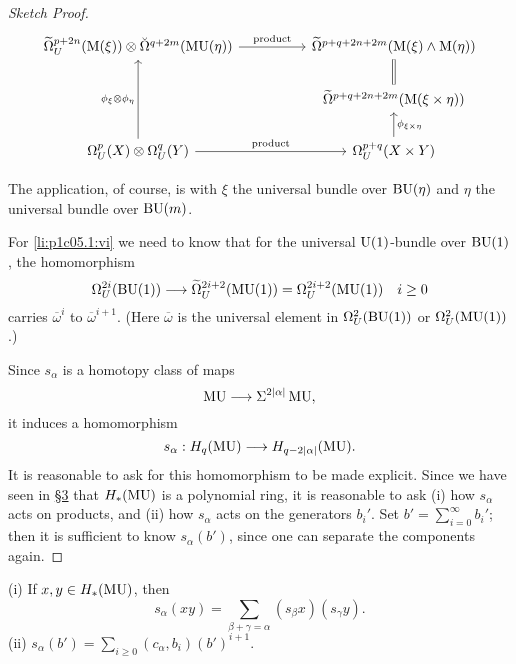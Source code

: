 \documentclass[../main]{subfiles}
\begin{document}
\begin{proof}[Sketch Proof]
\begin{equation*}
\begin{tikzcd}
{\tilde \Omega}_U^{p + 2n}(\te{M}(\xi)) \otimes {\breve \Omega}^{q + 2m}(\te{MU}(\eta)) \arrow[rr, "\mathrm{product}"] &  & {\tilde \Omega}^{p + q + 2n + 2m}(\te{M}(\xi) \wedge \te{M}(\eta))                             \\
                                                                                                                      &  & {\tilde \Omega}^{p + q + 2n + 2m}(\te{M}(\xi \times \eta)) \arrow[u, equals] \\
\Omega_U^p(X) \otimes \Omega_U^q(Y) \arrow[rr, "\mathrm{product}"] \arrow[uu, "\phi_\xi \otimes \phi_\eta"]           &  & \Omega_U^{p + q}(X \times Y) \arrow[u, "\phi_{\xi \times \eta}"']                   
\end{tikzcd}
\end{equation*}

The application, of course, is with $\xi$ the universal bundle over $\mathrm{BU}(\eta)$ and $\eta$ the universal bundle over $\mathrm{BU}(m)$.

For \ref{li:p1c05.1:vi} we need to know that for the universal $\mathrm{U}(1)$-bundle over $\mathrm{BU}(1)$, the homomorphism 
\begin{equation*}
	\Omega_U^{2i}(\mathrm{BU}(1)) \longrightarrow {\widetilde{\Omega}}_U^{2 i + 2}(\mathrm{MU}(1)) = \Omega_U^{2i + 2}(\mathrm{MU}(1)) \quad i \ge 0
\end{equation*} 
carries $\overline \omega^i$ to $\overline \omega^{i + 1}$. (Here $\overline \omega$ is the universal element in $\Omega_U^2(\mathrm{BU}(1))$ or $\Omega_U^2(\mathrm{MU}(1))$.)

Since $s_\alpha$ is a homotopy class of maps 
\begin{equation*}
	\operatorname{MU} \longrightarrow \Sigma^{2\lvert\alpha\rvert} \operatorname{MU},
\end{equation*}
it induces a homomorphism \[s_\alpha : H_q(\operatorname{MU}) \longrightarrow H_{q - 2\lvert\alpha\rvert} (\mathrm {MU}).\] It is reasonable to ask for this homomorphism to be made explicit. Since we have seen in \hyperref[sec:p1c3]{\S 3} that $H_\ast(\operatorname{MU})$ is a polynomial ring, it is reasonable to ask (i) how $s_\alpha$ acts on products, and (ii) how $s_\alpha$ acts on the generators $b_i'$. Set $\displaystyle b' = \sum_{i = 0}^\infty b_i'$; then it is sufficient to know $s_\alpha(b')$, since one can separate the components again.
\end{proof}

\begin{theorem}\label{thm:p1c05.2}
(i) If $x ,y \in H_\ast(\operatorname{MU})$, then \[s_\alpha (xy) = \sum_{\beta + \gamma = \alpha} (s_\beta x) (s_\gamma y).\] 
(ii) $\displaystyle s_\alpha(b') = \sum_{i \ge 0} (c_\alpha, b_i)(b')^{i + 1}.$
\end{theorem}
\end{document}
